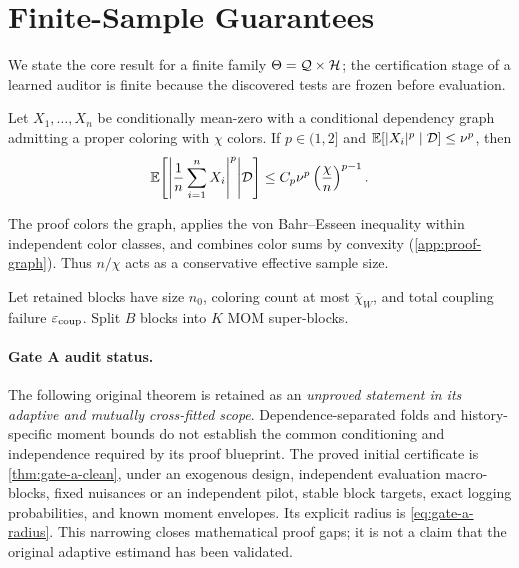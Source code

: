 \section{Finite-Sample Guarantees}
\label{sec:theory}

We state the core result for a finite family $\Theta=\mathcal{Q}\times\mathcal{H}$; the certification stage of a learned auditor is finite because the discovered tests are frozen before evaluation.

\begin{lemma}
\label{lem:graph-moment}
Let $X_1,\ldots,X_n$ be conditionally mean-zero with a conditional dependency graph admitting a proper coloring with $\chi$ colors. If $p\in(1,2]$ and $\mathbb{E}[|X_i|^p\mid\mathcal D]\le\nu^p$, then
\begin{equation}
\mathbb{E}\!\left[\left|\frac1n\sum_{i=1}^nX_i\right|^p\middle|\mathcal D\right]
\le C_p\nu^p\left(\frac{\chi}{n}\right)^{p-1}.
\label{eq:graph-moment}
\end{equation}
\end{lemma}
The proof colors the graph, applies the von Bahr--Esseen inequality within independent color classes, and combines color sums by convexity (\cref{app:proof-graph}). Thus $n/\chi$ acts as a conservative effective sample size.

Let retained blocks have size $n_0$, coloring count at most $\bar\chi_W$, and total coupling failure $\varepsilon_{\mathrm{coup}}$. Split $B$ blocks into $K$ MOM super-blocks.

\paragraph{Gate A audit status.}
The following original theorem is retained as an \emph{unproved statement in
its adaptive and mutually cross-fitted scope}. Dependence-separated folds and
history-specific moment bounds do not establish the common conditioning and
independence required by its proof blueprint. The proved initial certificate is
\cref{thm:gate-a-clean}, under an exogenous design, independent evaluation
macro-blocks, fixed nuisances or an independent pilot, stable block targets,
exact logging probabilities, and known moment envelopes. Its explicit radius
is \cref{eq:gate-a-radius}. This narrowing closes mathematical proof gaps;
it is not a claim that the original adaptive estimand has been validated.

